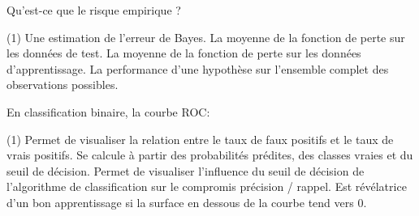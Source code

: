 \documentclass[solutions]{../cc}
\begin{document}
		\begin{question}
			Qu'est-ce que le risque empirique ?
			\begin{tasks}(1)
				\task Une estimation de l'erreur de Bayes.
				\task La moyenne de la fonction de perte sur les données de test.
				\task La moyenne de la fonction de perte sur les données d'apprentissage.
				\task La performance d'une hypothèse sur l'ensemble complet des observations possibles.
			\end{tasks}
		\end{question}

	\begin{question}
		En classification binaire, la courbe ROC:
		\begin{tasks}(1)
			\task Permet de visualiser la relation entre le taux de faux positifs et le taux de vrais positifs.
			\task Se calcule à partir des probabilités prédites, des classes vraies et du seuil de décision.
			\task Permet de visualiser l'influence du seuil de décision de l'algorithme de classification sur le compromis précision / rappel.
			\task Est révélatrice d'un bon apprentissage si la surface en dessous de la courbe tend vers 0.
		\end{tasks}
	\end{question}
	
\end{document}
